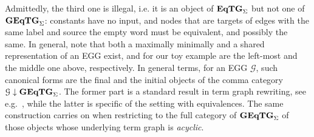 \documentclass[a4paper,UKenglish,cleveref,pdftex,thm-restate,numberwithinsect]{lipics-v2021}
\newcommand{\catname}[1]{\textbf{\textup{#1}}}
\newcommand{\EqTGs}{\catname{EqTG}_{\Sigma}}
\newcommand{\GEqTGs}{\catname{GEqTG}_{\Sigma}}
\begin{document}
\begin{center}
\begin{tikzpicture}[baseline=(w)]
\end{tikzpicture}
\qquad
{}
\end{center}


%
Admittedly, the third one is illegal, i.e. it is an object of $\EqTGs$ but not one of $\GEqTGs$: constants have no input, 
and nodes that are targets of edges with the same label and source the empty word must be equivalent,
and possibly the same.
%
In general, note that both a maximally minimally and a shared representation of an EGG exist, and for our 
toy example are the left-most and the middle one above, respectively. In general terms,
for an EGG $\mathcal{G}$, such canonical forms are the final and the initial objects of the comma category 
$\mathcal{G}  \downarrow \GEqTGs$. 
The former part is a standard result in term graph rewriting, see e.g.~\cite{xxx}, while the latter is specific 
of the setting with equivalences.
%
The same construction carries on when restricting to the full category of $\GEqTGs$ of those objects whose 
underlying term graph is \emph{acyclic}.
\end{document}

